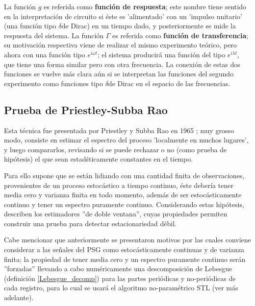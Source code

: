 \documentclass[12pt,a4paper]{mitthesis}
\newcommand{\ddd}{$\delta$}
\begin{document}
La funci\'on $g$ es referida como \textbf{funci\'on de respuesta}; este nombre tiene sentido en la
interpretaci\'on de circuito si \'este es 'alimentado' con un 'impulso unitario' (una funci\'on
tipo \ddd de Dirac) en un tiempo dado, y posteriormente se mide la respuesta del sistema.
La funci\'on $\Gamma$ es referida como \textbf{funci\'on de transferencia}; su motivaci\'on
respectiva viene de realizar el mismo experimento te\'orico, pero ahora con una funci\'on tipo 
$e^{i \omega t}$; el sistema producir\'a una funci\'on del tipo $e^{i\lambda t}$, que tiene una 
forma similar pero con otra frecuencia. La conexi\'on de estas dos funciones se vuelve m\'as clara 
a\'un si se interpretan las funciones del segundo experimento como funciones tipo \ddd de Dirac en 
el espacio de las frecuencias.


\subsection{Prueba de Priestley-Subba Rao}

Esta t\'ecnica fue presentada por Priestley y Subba Rao en 1965 \cite{Priestley69}; muy grosso 
modo, consiste en estimar el espectro del proceso 'localmente en muchos lugares', y luego 
compararlos, revisando si se puede rechazar o no (como prueba de hip\'otesis) el que sean 
estad\'sticamente constantes en el tiempo.

Para ello supone que se est\'an lidiando con una cantidad finita de observaciones, provenientes de 
un proceso estoc\'astico a tiempo continuo, \'este deber\'ia tener media cero y varianza finita en 
todo momento, adem\'as de ser estoc\'asticamente continuo y tener un espectro puramente continuo.
Considerando estas hip\'otesis, describen los estimadores ''de doble ventana'', cuyas propiedades 
permiten construir una prueba para detectar estacionariedad d\'ebil.

Cabe mencionar que anteriormente se presentaron motivos por las cuales conviene considerar a las 
se\~nales del PSG como estoc\'asticamente continuas y de varianza finita; la propiedad de tener 
media cero y un espectro puramente continuo ser\'an ''forzadas'' llevando a cabo num\'ericamente
una descomposici\'on de Lebesgue (definici\'on \ref{Lebesgue_decomp}) para las partes peri\'odicas 
y no-peri\'odicas de cada registro, para lo cual se usar\'a el algoritmo no-param\'etrico STL (ver 
m\'as adelante).
\end{document}
